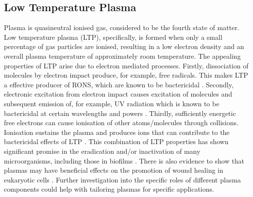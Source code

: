 \documentclass[11pt, oneside]{article}   	%
\begin{document}
\subsection*{Low Temperature Plasma}



Plasma is quasineutral ionised gas, considered to be the fourth state of matter.
Low temperature plasma (LTP), specifically, is formed when only a small percentage of gas particles are ionised, resulting in a low electron density and an overall plasma temperature of approximately room temperature.
The appealing properties of LTP arise due to electron mediated processes.
Firstly, dissociation of molecules by electron impact produce, for example, free radicals. This makes LTP a effective producer of RONS, which are known to be bactericidal \cite{Kong2009plasma}.
Secondly, electronic excitation from electron impact causes excitation of molecules and subsequent emission of, for example, UV radiation which is known to be bactericidal at certain wavelengths and powers \cite{Laroussi2004evaluation}.
Thirdly, sufficiently energetic free electrons can cause ionisation of other atoms/molecules through collisions. Ionisation sustains the plasma and produces ions that can contribute to the bactericidal effects of LTP \cite{Mendis2000a, Laroussi2002nonthermal}.
This combination of LTP properties has shown significant promise in the eradication and/or inactivation of many microorganisms, including those in biofilms \cite{Laroussi2005low}. 
There is also evidence to show that plasmas may have beneficial effects on the promotion of wound healing in eukaryotic cells \cite{Haertel2014nonthermal, Kramer2013suitability}. %
Further investigation into the specific roles of different plasma components could help with tailoring plasmas for specific applications.
\end{document}
